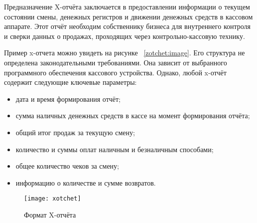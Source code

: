 Предназначение X-отчёта заключается в предоставлении информации о текущем состоянии смены, денежных регистров и движении денежных средств в кассовом аппарате. Этот отчёт необходим собственнику бизнеса для внутреннего контроля и сверки данных о продажах, проходящих через контрольно-кассовую технику. 

Пример x-отчета можно увидеть на рисунке ~\ref{zotchet:image}. Его структура не определена законодательными требованиями. Она зависит от выбранного программного обеспечения кассового устройства. Однако, любой x-отчёт содержит следующие ключевые параметры: 

\begin{itemize}
	\item дата и время формирования отчёт; 
	\item сумма наличных денежных средств в кассе на момент формирования отчёта; 
	\item общий итог продаж за текущую смену; 
	\item количество и суммы оплат наличным и безналичным способами; 
	\item общее количество чеков за смену; 
	\item информацию о количестве и сумме возвратов. 
\end{itemize}

\begin{figure}[ht]
	\centering
	\texttt{[image: xotchet]} 
	\caption{Формат X-отчёта}
	\label{xotchet:image}
\end{figure}
